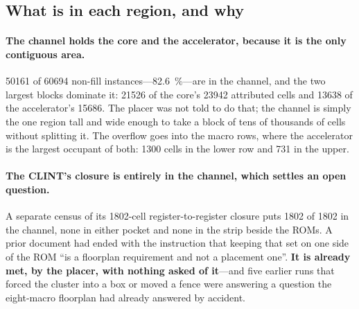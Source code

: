 \documentclass[11pt,a4paper]{article}
\begin{document}
\subsection{What is in each region, and why}

\paragraph{The channel holds the core and the accelerator, because it
is the only contiguous area.} \num{50161} of \num{60694} non-fill
instances---\SI{82.6}{\percent}---are in the channel, and the two
largest blocks dominate it: \num{21526} of the core's \num{23942}
attributed cells and \num{13638} of the accelerator's \num{15686}. The
placer was not told to do that; the channel is simply the one region
tall and wide enough to take a block of tens of thousands of cells
without splitting it. The overflow goes into the macro rows, where the
accelerator is the largest occupant of both: \num{1300} cells in the
lower row and \num{731} in the upper.

\paragraph{The CLINT's closure is entirely in the channel, which
settles an open question.} A separate census of its \num{1802}-cell
register-to-register closure puts \num{1802} of \num{1802} in the
channel, none in either pocket and none in the strip beside the ROMs.
A prior document had ended with the instruction that keeping that set
on one side of the ROM ``is a floorplan requirement and not a placement
one''. \textbf{It is already met, by the placer, with nothing asked of
it}---and five earlier runs that forced the cluster into a box or moved
a fence were answering a question the eight-macro floorplan had already
answered by accident.
\end{document}
